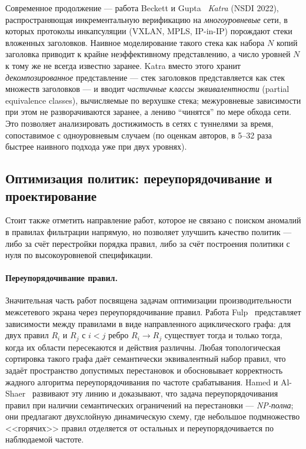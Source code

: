 Современное продолжение --- работа Beckett и Gupta~\cite{beckett2022katra} \emph{Katra} (NSDI 2022), распространяющая инкрементальную верификацию на \emph{многоуровневые} сети, в которых протоколы инкапсуляции (VXLAN, MPLS, IP-in-IP) порождают стеки вложенных заголовков. Наивное моделирование такого стека как набора $N$ копий заголовка приводит к крайне неэффективному представлению, а число уровней $N$ к тому же не всегда известно заранее. Katra вместо этого хранит \emph{декомпозированное} представление --- стек заголовков представляется как стек множеств заголовков --- и вводит \emph{частичные классы эквивалентности} (partial equivalence classes), вычисляемые по верхушке стека; межуровневые зависимости при этом не разворачиваются заранее, а лениво ``чинятся'' по мере обхода сети. Это позволяет анализировать достижимость в сетях с туннелями за время, сопоставимое с одноуровневым случаем (по оценкам авторов, в 5--32 раза быстрее наивного подхода уже при двух уровнях).

\subsection{Оптимизация политик: переупорядочивание и проектирование}
\label{sec:Section2:optimization}

Стоит также отметить направление работ, которое не связано с поиском аномалий в правилах фильтрации напрямую, но позволяет улучшить качество политик --- либо за счёт перестройки порядка правил, либо за счёт построения политики с нуля по высокоуровневой спецификации.

\paragraph{Переупорядочивание правил.} Значительная часть работ посвящена задачам оптимизации производительности межсетевого экрана через переупорядочивание правил. Работа Fulp~\cite{fulp2005optimization} представляет зависимости между правилами в виде направленного ациклического графа: для двух правил $R_i$ и $R_j$ с $i < j$ ребро $R_i \to R_j$ существует тогда и только тогда, когда их области пересекаются и действия различны. Любая топологическая сортировка такого графа даёт семантически эквивалентный набор правил, что задаёт пространство допустимых перестановок и обосновывает корректность жадного алгоритма переупорядочивания по частоте срабатывания. Hamed и Al-Shaer~\cite{hamed2006dynamic} развивают эту линию и доказывают, что задача переупорядочивания правил при наличии семантических ограничений на перестановки --- \emph{NP-полна}; они предлагают двухслойную динамическую схему, где небольшое подмножество <<горячих>> правил отделяется от остальных и переупорядочивается по наблюдаемой частоте.

